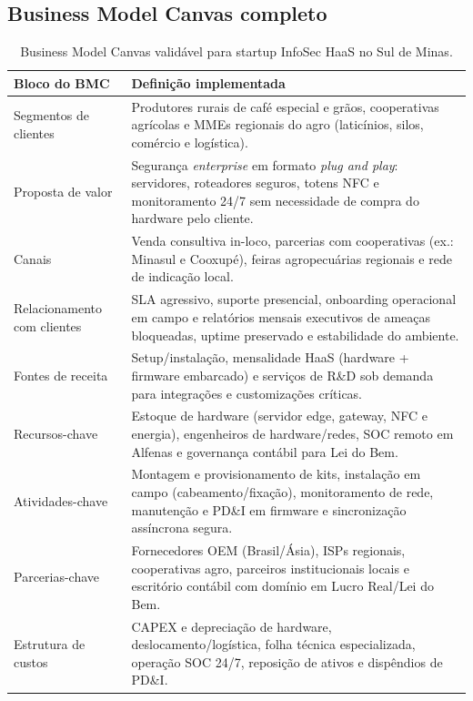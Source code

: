 \subsection{Business Model Canvas completo}

\begin{table}[htb]
\centering
\caption{Business Model Canvas validável para startup InfoSec HaaS no Sul de Minas.}
\label{tab:bmc-haas-infosec}
\begin{tabular}{|p{}|p{}|}
\hline
\textbf{Bloco do BMC} & \textbf{Definição implementada} \\
\hline
Segmentos de clientes & Produtores rurais de café especial e grãos, cooperativas agrícolas e MMEs regionais do agro (laticínios, silos, comércio e logística). \\
\hline
Proposta de valor & Segurança \textit{enterprise} em formato \textit{plug and play}: servidores, roteadores seguros, totens NFC e monitoramento 24/7 sem necessidade de compra do hardware pelo cliente. \\
\hline
Canais & Venda consultiva in-loco, parcerias com cooperativas (ex.: Minasul e Cooxupé), feiras agropecuárias regionais e rede de indicação local. \\
\hline
Relacionamento com clientes & SLA agressivo, suporte presencial, onboarding operacional em campo e relatórios mensais executivos de ameaças bloqueadas, uptime preservado e estabilidade do ambiente. \\
\hline
Fontes de receita & Setup/instalação, mensalidade HaaS (hardware + firmware embarcado) e serviços de R\&D sob demanda para integrações e customizações críticas. \\
\hline
Recursos-chave & Estoque de hardware (servidor edge, gateway, NFC e energia), engenheiros de hardware/redes, SOC remoto em Alfenas e governança contábil para Lei do Bem. \\
\hline
Atividades-chave & Montagem e provisionamento de kits, instalação em campo (cabeamento/fixação), monitoramento de rede, manutenção e PD\&I em firmware e sincronização assíncrona segura. \\
\hline
Parcerias-chave & Fornecedores OEM (Brasil/Ásia), ISPs regionais, cooperativas agro, parceiros institucionais locais e escritório contábil com domínio em Lucro Real/Lei do Bem. \\
\hline
Estrutura de custos & CAPEX e depreciação de hardware, deslocamento/logística, folha técnica especializada, operação SOC 24/7, reposição de ativos e dispêndios de PD\&I. \\
\hline
\end{tabular}
\end{table}

